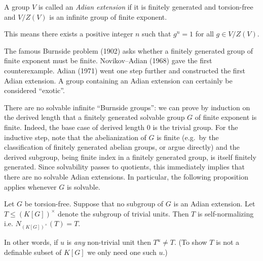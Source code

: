 \begin{definition}
    A group $V$ is called an \emph{Adian extension} if it is finitely generated and torsion-free and $V / Z(V)$ is an infinite group of finite exponent.
\end{definition}

This means there exists a positive integer $n$ such that $g^n = 1$ for all $g \in V / Z(V)$.

\begin{remark}
    The famous Burnside problem (1902) asks whether a finitely generated group of finite exponent must be finite.
    Novikov--Adian (1968) gave the first counterexample.
    Adian (1971) went one step further and constructed the first Adian extension.
    A group containing an Adian extension can certainly be considered ``exotic''.
\end{remark}

\begin{example}
    There are no solvable infinite ``Burnside groups'': we can prove by induction on the derived length that a finitely generated solvable group $G$ of finite exponent is finite.
    Indeed, the base case of derived length $0$ is the trivial group.
    For the inductive step, note that the abelianization of $G$ is finite (e.g.\ by the classification of finitely generated abelian groups, or argue directly) and the derived subgroup, being finite index in a finitely generated group, is itself finitely generated.
    Since solvability passes to quotients, this immediately implies that there are no solvable Adian extensions.
    In particular, the following proposition applies whenever $G$ is solvable.
\end{example}

\begin{proposition}
    \label{proposition:selfnormalizing_trivial_units}
    Let $G$ be torsion-free.
    Suppose that no subgroup of $G$ is an Adian extension.
    Let $T \leq (K[G])^\times$ denote the subgroup of trivial units.
    Then $T$ is self-normalizing i.e. $N_{(K[G])^\times}(T) = T$.
\end{proposition}

In other words, if $u$ is \emph{any} non-trivial unit then $T^u \neq T$.
(To show $T$ is not a definable subset of $K[G]$ we only need one such $u$.)

